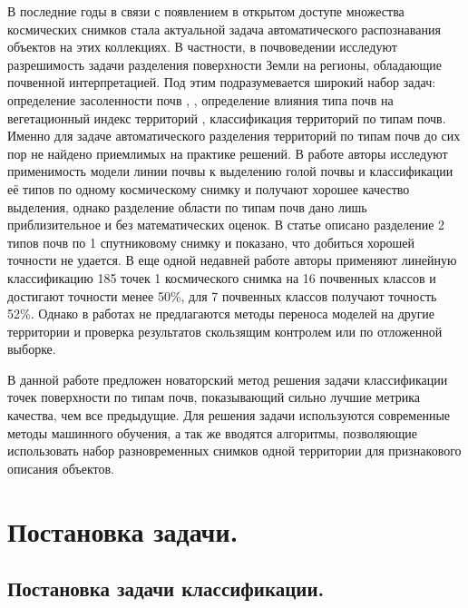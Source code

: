 \documentclass[14pt]{extarticle}
\begin{document}
\par
В последние годы в связи с появлением в открытом доступе множества космических снимков стала
актуальной задача автоматического распознавания объектов на этих коллекциях. В частности,
в почвоведении исследуют разрешимость задачи разделения поверхности Земли на регионы,
обладающие почвенной интерпретацией. Под этим подразумевается широкий набор задач: 
определение засоленности почв \cite{salt-1}, \cite{salt-2}, 
определение влияния типа почв на вегетационный
индекс территорий \cite{soil-line-2}, классификация территорий по типам почв. 
Именно для задаче автоматического разделения территорий по типам почв до сих пор не найдено
приемлимых на практике решений. В работе \cite{soil-line-1} авторы исследуют применимость
модели линии почвы к выделению голой почвы и классификации её типов по одному космическому снимку
и получают хорошее качество выделения, однако разделение области по типам почв дано лишь 
приблизительное и без математических оценок. В статье \cite{soil-line-3} описано разделение
2 типов почв по 1 спутниковому снимку и показано, что добиться хорошей точности не удается.
В еще одной недавней работе \cite{soil-line-6} авторы применяют линейную классификацию 185
точек 1 космического снимка на 16 почвенных классов и достигают точности менее 50\%,
для 7 почвенных классов получают точность 52\%. Однако в работах не предлагаются методы
переноса моделей на другие территории и проверка результатов скользящим контролем или по 
отложенной выборке.
\par
В данной работе предложен новаторский метод решения задачи классификации точек поверхности
по типам почв, показывающий сильно лучшие метрика качества, чем все предыдущие. Для решения
задачи используются современные методы машинного обучения, а так же вводятся алгоритмы,
позволяющие использовать набор разновременных снимков одной территории для признакового 
описания объектов.

\section{Постановка задачи.}


\subsection{Постановка задачи классификации.}
\end{document}
